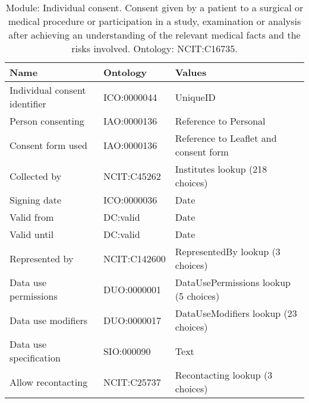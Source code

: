\documentclass{article}
\begin{document}
\begin{table}[htb]
\begin{tabular}{lll}
Name & Ontology & Values \\
\hline
Individual consent identifier & ICO:0000044 & UniqueID \\
Person consenting & IAO:0000136 & Reference to Personal \\
Consent form used & IAO:0000136 & Reference to Leaflet and consent form \\
Collected by & NCIT:C45262 & Institutes lookup (218 choices) \\
Signing date & ICO:0000036 & Date \\
Valid from & DC:valid & Date \\
Valid until & DC:valid & Date \\
Represented by & NCIT:C142600 & RepresentedBy lookup (3 choices) \\
Data use permissions & DUO:0000001 & DataUsePermissions lookup (5 choices) \\
Data use modifiers & DUO:0000017 & DataUseModifiers lookup (23 choices) \\
Data use specification & SIO:000090 & Text \\
Allow recontacting & NCIT:C25737 & Recontacting lookup (3 choices) \\
\hline
\end{tabular}
\caption[Module: Individual consent]{\label{table:table5} Module: Individual consent. Consent given by a patient to a surgical or medical procedure or participation in a study, examination or analysis after achieving an understanding of the relevant medical facts and the risks involved. Ontology: NCIT:C16735. }
\end{table}
\end{document}

